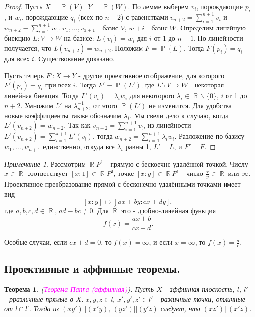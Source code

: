 \documentclass[a4paper,100pt]{article}
\theoremstyle{indented}
\newtheorem{theorem}{Теорема}
\theoremstyle{definition}
\theoremstyle{remark}
\newtheorem{remark}{Примечание}
\DeclareMathOperator{\ra}{\rightarrow}
\DeclareMathOperator{\RR}{\mathbb{R}}
\DeclareMathOperator{\PP}{\mathbb{P}}
\begin{document}
\begin{proof}
    Пусть $X = \PP(V)$, $Y = \PP(W)$. По лемме выберем $v_i$, порождающие $p_i$, и $w_i$, порождающие $q_i$ (всех по $n+2$) с равенствами $v_{n+2} = \sum_{i=1}^{n+1} v_i$ и $w_{n+2} = \sum_{i=1}^{n+1} w_i$. $v_1, \ldots, v_{n+1}$ - базис $V$, $w+i$ - базис $W$. Определим линейную биекцию $L: V \ra W$ на базисе: $L(v_i) = w_i$ для $i$ от 1 до $n+1$. По линейности получается, что $L(v_{n+2}) = w_{n+2}$. Положим $F = \PP(L)$. Тогда $F(p_i) = q_i$ для всех $i$. Существование доказано. \ 

    Пусть теперь $F': X \ra Y$ - другое проективное отображение, для которого $F'(p_i) = q_i$ при всех $i$. Тогда $F' = \PP(L')$, где $L': V \ra W$ - некоторая линейная биекция. Тогда $L'(v_i) = \lambda_i w_i$ для некоторого $\lambda_i \in \RR \backslash \{0\}$, $i$ от 1 до $n+2$. Умножим $L'$ на $\lambda_{n+2}^{-1}$, от этого $\PP(L')$ не изменится. Для удобства новые коэффициенты также обозначим $\lambda_i$. Мы свели дело к случаю, когда $L'(v_{n+2}) = w_{n+2}$. Так как $v_{n+2} = \sum_{i=1}^{n+1} v_i$, из линейности $L'(v_{n+2}) = \sum_{i=1}^{n+1} L'(v_i)$, тогда $w_{n+2} = \sum_{i=1}^{n+1} \lambda_i w_i$. Разложение по базису $w_1, \ldots, w_{n+1}$ единственно, откуда все $\lambda_i$ равны 1, $L' = L$, и $F' = F$. 
\end{proof}

\begin{remark}
    Рассмотрим $\RR P^1$ -  прямую с бескоечно удалённой точкой. Числу $x \in \RR$ соответствует $[x:1] \in \RR P^1$, точке $[x:y] \in \RR P^1$ - число $\frac{x}{y} \in \RR$ или $\infty$. Проективное преобразование прямой с бесконечно удалёнными точками имеет вид 
    \[
        [x:y]\mapsto [ax+by:cx+dy], 
    \]
    где $a, b, c, d\in \RR$, $ad-bc \neq 0$. Для $\hat{\RR}$ это - дробно-линейная функция
    \[
        f(x)=\frac{ax+b}{cx+d}. 
    \]

    Особые случаи, если $cx+d = 0$, то $f(x) = \infty$, и если $x = \infty$, то $f(x) = \frac{a}{c}$. 
\end{remark}

\subsection{Проективные и аффинные теоремы.}

\begin{theorem}
    (\textit{\textcolor{magenta}{\hypertarget{s46}{Теорема Паппа (аффинная)}}}). Пусть $X$ - аффинная плоскость, $l$, $l'$ - рразличные прямые в $X$. $x, y, z\in l$, $x', y', z'\in l'$ - различные точки, отличные от $l \cap l'$. Тогда из $(xy')||(x'y)$, $(yz')||(y'z)$ следует, что $(xz')||(x'z)$. 
\end{theorem} \ 
\end{document}
